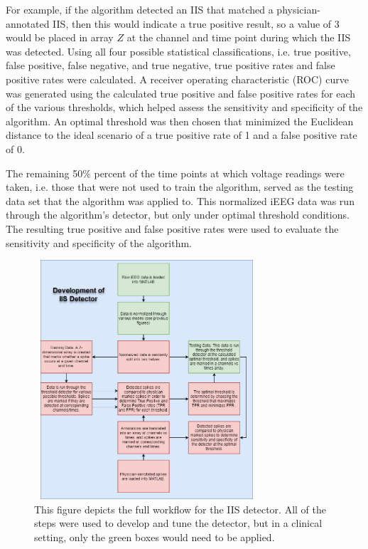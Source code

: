 \documentclass[letterpaper, 10pt, conference]{ieeeconf}      %
\begin{document}
For example, if the algorithm detected an IIS that matched a physician-annotated IIS, then this would indicate a true positive result, so a value of 3 would be placed in array $Z$ at the channel and time point during which the IIS was detected. Using all four possible statistical classifications, i.e. true positive, false positive, false negative, and true negative, true positive rates and false positive rates were calculated. A receiver operating characteristic (ROC) curve was generated using the calculated true positive and false positive rates for each of the various thresholds, which helped assess the sensitivity and specificity of the algorithm.  An optimal threshold was then chosen that minimized the Euclidean distance to the ideal scenario of a true positive rate of 1 and a false positive rate of 0.

The remaining 50\% percent of the time points at which voltage readings were taken, i.e. those that were not used to train the algorithm, served as the testing data set that the algorithm was applied to. This normalized iEEG data was run through the algorithm's detector, but only under optimal threshold conditions. The resulting true positive and false positive rates were used to evaluate the sensitivity and specificity of the algorithm. 

\begin{figure}[t!]
    \centering
    \includegraphics[height=3.5in, width=3.3in]{DetectorDevelopment.png}
    \caption{This figure depicts the full workflow for the IIS detector. All of the steps were used to develop and tune the detector, but in a clinical setting, only the green boxes would need to be applied.}
    \label{fig4}
\end{figure}
\end{document}
